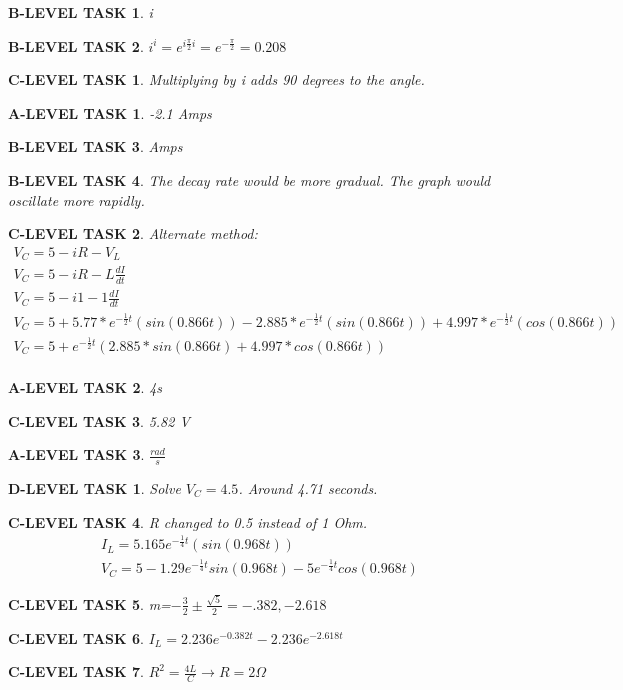 \documentclass{book}
\numberwithin{equation}{section}
\newtheorem{alevel}{A-LEVEL TASK}
\newtheorem{blevel}{B-LEVEL TASK}
\newtheorem{clevel}{C-LEVEL TASK}
\newtheorem{dlevel}{D-LEVEL TASK}
\theoremstyle{definition}
\begin{document}
\begin{blevel}i\end{blevel}
\begin{blevel}$i^i=e^{i\frac{\pi}{2}i}=e^{-\frac{\pi}{2}}=0.208$\end{blevel}
\begin{clevel}Multiplying by i adds 90 degrees to the angle.\end{clevel}
\begin{alevel}-2.1 Amps\end{alevel}
\begin{blevel}Amps\end{blevel}
\begin{blevel}The decay rate would be more gradual. The graph would oscillate more rapidly.\end{blevel}
\begin{clevel} Alternate method:
\begin{align*}
V_C=5-iR-V_L\\
V_C=5-iR-L\frac{dI}{dt}\\
V_C=5-i1-1\frac{dI}{dt}\\
V_C=5+5.77*e^{-\frac{1}{2} t}(sin(0.866 t))-2.885*e^{-\frac{1}{2} t}(sin(0.866 t))+
4.997*e^{-\frac{1}{2} t}(cos(0.866 t))\\
V_C=5+e^{-\frac{1}{2} t}(2.885*sin(0.866 t)+4.997*cos(0.866 t))\\
\end{align*}
\end{clevel}

\begin{alevel}4s\end{alevel}
\begin{clevel}5.82 V \end{clevel}
\begin{alevel}$\frac{rad}{s}$\end{alevel}
\begin{dlevel}Solve $V_C=4.5$. Around 4.71 seconds.\end{dlevel}
\begin{clevel} R changed to 0.5 instead of 1 Ohm.
\begin{align*}
I_L=5.165e^{-\frac{1}{4} t}(sin(0.968 t))\\
V_C=5-1.29e^{-\frac{1}{4}t}sin(0.968 t)-5e^{-\frac{1}{4}t}cos(0.968 t)
\end{align*}
\end{clevel}
\begin{clevel}m=$-\frac{3}{2} \pm \frac{\sqrt{5}}{2}=-.382,-2.618$\end{clevel}
\begin{clevel}$I_L=2.236e^{-0.382 t}-2.236e^{-2.618 t}$\end{clevel}
\begin{clevel}$R^2=\frac{4L}{C} \rightarrow R=2\Omega$\end{clevel}
\end{document}
